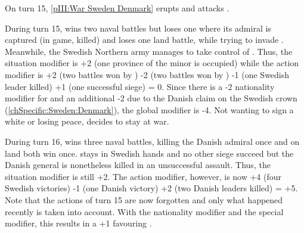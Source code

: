 \begin{exemple}
  On turn 15, \ref{pIII:War Sweden Denmark} erupts and \paysDanemark attacks
  \SUE.

  During turn 15, \SUE wins two naval battles but loses one where its admiral
  is captured (in game, killed) and loses one land battle, while trying to
  invade \provinceSkane. Meanwhile, the Swedish Northern army manages to take
  control of \provinceTrondelag. Thus, the situation modifier is +2 (one
  province of the minor is occupied) while the action modifier is +2 (two
  battles won by \SUE) -2 (two battles won by \paysDanemark) -1 (one Swedish
  leader killed) +1 (one successful siege) = 0. Since there is a -2
  nationality modifier for \paysDanemark and an additional -2 due to the
  Danish claim on the Swedish crown (\ref{chSpecific:Sweden:Denmark}), the
  global modifier is -4. Not wanting to sign a white or losing peace, \SUE
  decides to stay at war.

  \smallskip

  During turn 16, \SUE wins three naval battles, killing the Danish admiral
  once and on land both win once. \provinceTrondelag stays in Swedish hands
  and no other siege succeed but the Danish general \leaderRantzau is
  nonetheless killed in an unsuccessful assault. Thus, the situation modifier
  is still +2. The action modifier, however, is now +4 (four Swedish
  victories) -1 (one Danish victory) +2 (two Danish leaders killed) = +5. Note
  that the actions of turn 15 are now forgotten and only what happened
  recently is taken into account. With the nationality modifier and the
  special modifier, this results in a +1 favouring \SUE.


\end{exemple}
